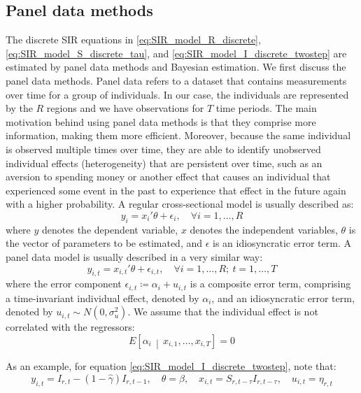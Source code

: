 \documentclass[12pt]{article}
\begin{document}
	\subsection{Panel data methods}\label{subsec:discrete_sir_panel}
	The discrete SIR equations in \eqref{eq:SIR_model_R_discrete}, \eqref{eq:SIR_model_S_discrete_tau}, and \eqref{eq:SIR_model_I_discrete_twostep} are estimated by panel data methods and Bayesian estimation. We first discuss the panel data methods. Panel data refers to a dataset that contains measurements over time for a group of individuals. In our case, the individuals are represented by the $R$ regions and we have observations for $T$ time periods. The main motivation behind using panel data methods is that they comprise more information, making them more efficient. Moreover, because the same individual is observed multiple times over time, they are able to identify unobserved individual effects (heterogeneity) that are persistent over time, such as an aversion to spending money or another effect that causes an individual that experienced some event in the past to experience that effect in the future again with a higher probability. A regular cross-sectional model is usually described as:
	    \begin{equation}\label{eq:cross-section}
    	    y_i = x_i'\theta + \epsilon_i, \quad\forall i=1,\dotsc,R
	    \end{equation}
	where $y$ denotes the dependent variable, $x$ denotes the independent variables, $\theta$ is the vector of parameters to be estimated, and $\epsilon$ is an idiosyncratic error term. A panel data model is usually described in a very similar way:
	    \begin{equation}\label{eq:paneldata}
	        y_{i,t} = x_{i,t}'\theta + \epsilon_{i,t}, \quad\forall i=1,\dotsc,R;~t=1,\dotsc,T
	    \end{equation}
	where the error component $\epsilon_{i,t} \coloneqq \alpha_i + u_{i,t}$ is a composite error term, comprising a time-invariant individual effect, denoted by $\alpha_i$, and an idiosyncratic error term, denoted by $u_{i,t} \sim N\left(0, \sigma^2_u\right)$. We assume that the individual effect is not correlated with the regressors:
	    \begin{equation}\label{eq:orthogonality_assumption}
	        E\left[\alpha_i \,\middle|\, x_{i,1}, \dotsc, x_{i, T}\right] = 0
	    \end{equation}
	    
	As an example, for equation \eqref{eq:SIR_model_I_discrete_twostep}, note that:
	    \begin{equation*}
	        y_{i,t} = I_{r,t} - \left(1 - \hat{\gamma}\right) I_{r,t-1}, \quad
	        \theta = \beta, \quad
            x_{i,t} = S_{r,t-\tau}I_{r,t-\tau}, \quad
            u_{i,t} = \eta_{r,t}
	    \end{equation*}
	    
\end{document}
